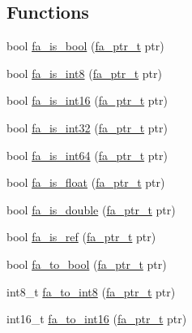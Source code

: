 \subsection*{Functions}
\begin{DoxyCompactItemize}
\item 
bool \hyperlink{group___fa_gaea204b4c094f2e6fb13a91e22f3f80de}{fa\-\_\-is\-\_\-bool} (\hyperlink{group___fa_ga915ddeae99ad7568b273d2b876425197}{fa\-\_\-ptr\-\_\-t} ptr)
\item 
bool \hyperlink{group___fa_gad0959793c33e61bf126ae45431cce74e}{fa\-\_\-is\-\_\-int8} (\hyperlink{group___fa_ga915ddeae99ad7568b273d2b876425197}{fa\-\_\-ptr\-\_\-t} ptr)
\item 
bool \hyperlink{group___fa_gaa63a843cb966ae896513c9fa2eafc82c}{fa\-\_\-is\-\_\-int16} (\hyperlink{group___fa_ga915ddeae99ad7568b273d2b876425197}{fa\-\_\-ptr\-\_\-t} ptr)
\item 
bool \hyperlink{group___fa_gaae5fd4fcfa0d1d306bb7be3a5bf3b238}{fa\-\_\-is\-\_\-int32} (\hyperlink{group___fa_ga915ddeae99ad7568b273d2b876425197}{fa\-\_\-ptr\-\_\-t} ptr)
\item 
bool \hyperlink{group___fa_ga2cb6a7ad52d1cbee60fa2eaa57fde75e}{fa\-\_\-is\-\_\-int64} (\hyperlink{group___fa_ga915ddeae99ad7568b273d2b876425197}{fa\-\_\-ptr\-\_\-t} ptr)
\item 
bool \hyperlink{group___fa_gaf2acf9a74b67d56c155fec11e55d6129}{fa\-\_\-is\-\_\-float} (\hyperlink{group___fa_ga915ddeae99ad7568b273d2b876425197}{fa\-\_\-ptr\-\_\-t} ptr)
\item 
bool \hyperlink{group___fa_ga1faadaefa3dc646cfe78bb01b22b783e}{fa\-\_\-is\-\_\-double} (\hyperlink{group___fa_ga915ddeae99ad7568b273d2b876425197}{fa\-\_\-ptr\-\_\-t} ptr)
\item 
bool \hyperlink{group___fa_gaa7ee523c4d3f4aea6d3e061d4e52c634}{fa\-\_\-is\-\_\-ref} (\hyperlink{group___fa_ga915ddeae99ad7568b273d2b876425197}{fa\-\_\-ptr\-\_\-t} ptr)
\item 
bool \hyperlink{group___fa_ga55ece575ff8ef52ba6a9ba563ca02a1d}{fa\-\_\-to\-\_\-bool} (\hyperlink{group___fa_ga915ddeae99ad7568b273d2b876425197}{fa\-\_\-ptr\-\_\-t} ptr)
\item 
int8\-\_\-t \hyperlink{group___fa_ga74132ccc642fd868e3dc263f7ad7f6bd}{fa\-\_\-to\-\_\-int8} (\hyperlink{group___fa_ga915ddeae99ad7568b273d2b876425197}{fa\-\_\-ptr\-\_\-t} ptr)
\item 
int16\-\_\-t \hyperlink{group___fa_ga7b88b5b578f58271ba3553d1d46b5576}{fa\-\_\-to\-\_\-int16} (\hyperlink{group___fa_ga915ddeae99ad7568b273d2b876425197}{fa\-\_\-ptr\-\_\-t} ptr)

\end{DoxyCompactItemize}
